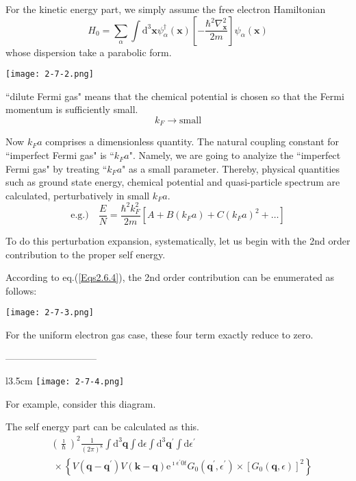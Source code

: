For the kinetic energy part, we simply assume the free electron Hamiltonian
\[H_0 = \sum_\alpha \int \mathrm{d}^3 \mathbf{x} \psi_\alpha^\dagger (\mathbf{x}) \left[-\frac{\hbar^2\nabla^2_{\mathbf{x}}}{2m}\right]\psi_\alpha(\mathbf{x})\]
whose dispersion take a parabolic form.
\begin{center} \label{Fig2.7.2} \texttt{[image: 2-7-2.png]} \end{center}

``dilute Fermi gas" means that the chemical potential is chosen so that the Fermi momentum is sufficiently small. $$k_F \rightarrow \text{small}$$

Now $k_F a$ comprises a dimensionless quantity. The natural coupling constant for ``imperfect Fermi gas" is ``$k_F a$". Namely, we are going to analyize the ``imperfect Fermi gas" by treating ``$k_F a$" as a small parameter. Thereby, physical quantities such as ground state energy, chemical potential and quasi-particle spectrum are calculated, perturbatively in small $k_F a$.
\[ \text{e.g.)} \quad \frac{E}{N} = \frac{\hbar^2 k_F^2}{2m} \left[ A + B(k_F a) + C{(k_F a)}^2 + \ldots \right] \]

To do this perturbation expansion, systematically, let us begin with the 2nd order contribution to the proper self energy.

According to eq.(\ref{Eqs2.6.4}), the 2nd order contribution can be enumerated as follows:
\begin{center}\label{Fig2.7.3} \texttt{[image: 2-7-3.png]} \end{center}

For the uniform electron gas case, these four term exactly reduce to zero.
\begin{center}-----------------------------\end{center}

\begin{wrapfigure}{l}{3.5cm}
\label{Fig2.7.4} \texttt{[image: 2-7-4.png]}
\end{wrapfigure}
For example, consider this diagram.

The self energy part can be calculated as this.
\[ \begin{split} & {\left(\frac{\imath}{\hbar} \right)}^2 \frac{1}{\left( 2\pi \right)^8} \int \mathrm{d}^3 \mathbf{q} \int \mathrm{d}\epsilon \int \mathrm{d}^3 \mathbf{q}^{'} \int \mathrm{d} \epsilon^{'} \\
& \  \times \left\{ V(\mathbf{q}-\mathbf{q}^{'})V(\mathbf{k}-\mathbf{q})\mathrm{e}^{\imath \epsilon^{'} 0 t} G_0(\mathbf{q}^{'},\epsilon^{'}) \times \left[ G_0(\mathbf{q},\epsilon) \right]^2 \right \} \end{split} \]

